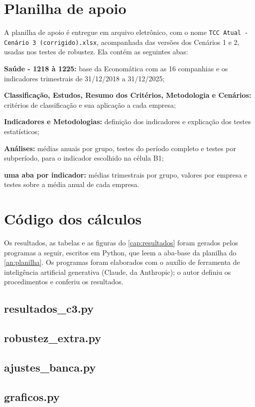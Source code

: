 \chapter{Planilha de apoio}\label{an:planilha}

A planilha de apoio é entregue em arquivo eletrônico, com o nome
\texttt{TCC Atual - Cenário 3 (corrigido).xlsx}, acompanhada das versões dos
Cenários 1 e 2, usadas nos testes de robustez. Ela contém as seguintes abas:

\begin{alineas}
\item \textbf{Saúde - 1218 à 1225:} base da Economática com as 16 companhias e os
indicadores trimestrais de 31/12/2018 a 31/12/2025;
\item \textbf{Classificação, Estudos, Resumo dos Critérios, Metodologia e Cenários:}
critérios de classificação e sua aplicação a cada empresa;
\item \textbf{Indicadores e Metodologias:} definição dos indicadores e explicação dos
testes estatísticos;
\item \textbf{Análises:} médias anuais por grupo, testes do período completo e testes
por subperíodo, para o indicador escolhido na célula B1;
\item \textbf{uma aba por indicador:} médias trimestrais por grupo, valores por
empresa e testes sobre a média anual de cada empresa.
\end{alineas}

\chapter{Código dos cálculos}\label{an:script}

Os resultados, as tabelas e as figuras do \autoref{cap:resultados} foram gerados
pelos programas a seguir, escritos em Python, que leem a aba-base da planilha do
\autoref{an:planilha}. Os programas foram elaborados com o auxílio de ferramenta
de inteligência artificial generativa (Claude, da Anthropic); o autor definiu os
procedimentos e conferiu os resultados.

\section*{resultados\_c3.py}


\section*{robustez\_extra.py}


\section*{ajustes\_banca.py}


\section*{graficos.py}

